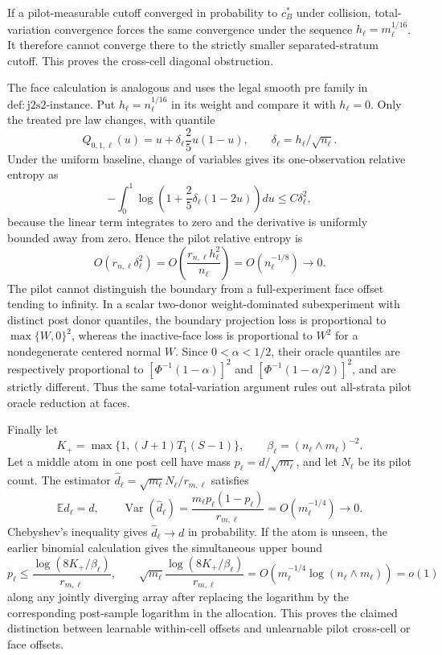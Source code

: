 If a pilot-measurable cutoff converged in probability to \(c_B^*\) under collision, total-variation convergence forces the same convergence under the sequence \(h_\ell=m_\ell^{1/16}\).  It therefore cannot converge there to the strictly smaller separated-stratum cutoff.  This proves the cross-cell diagonal obstruction.

The face calculation is analogous and uses the legal smooth pre family in \(\mathrm{def:j2s2\mbox{-}instance}\).  Put
\(h_\ell=n_\ell^{1/16}\) in its weight and compare it with \(h_\ell=0\).  Only the treated pre law changes, with quantile
\[
 Q_{0,1,\ell}(u)=u+\delta_\ell\frac25u(1-u),
 \qquad \delta_\ell=h_\ell/\sqrt{n_\ell}.
\]
Under the uniform baseline, change of variables gives its one-observation relative entropy as
\[
 -\int_0^1\log\left(1+\frac25\delta_\ell(1-2u)\right)du
 \leq C\delta_\ell^2,
\]
because the linear term integrates to zero and the derivative is uniformly bounded away from zero.  Hence the pilot relative entropy is
\[
 O(r_{n,\ell}\delta_\ell^2)
 =O\left(\frac{r_{n,\ell}h_\ell^2}{n_\ell}\right)
 =O(n_\ell^{-1/8})\longrightarrow0.
\]
The pilot cannot distinguish the boundary from a full-experiment face offset tending to infinity.  In a scalar two-donor weight-dominated subexperiment with distinct post donor quantiles, the boundary projection loss is proportional to
\(\max\{W,0\}^2\), whereas the inactive-face loss is proportional to \(W^2\) for a nondegenerate centered normal \(W\).  Since \(0<\alpha<1/2\), their oracle quantiles are respectively proportional to
\([\Phi^{-1}(1-\alpha)]^2\) and
\([\Phi^{-1}(1-\alpha/2)]^2\), and are strictly different.  Thus the same total-variation argument rules out all-strata pilot oracle reduction at faces.

Finally let
\[
 K_+=\max\{1,(J+1)T_1(S-1)\},
 \qquad \beta_\ell=(n_\ell\wedge m_\ell)^{-2}.
\]
Let a middle atom in one post cell have mass
\(p_\ell=d/\sqrt{m_\ell}\), and let \(N_\ell\) be its pilot count.  The estimator
\(\widehat d_\ell=\sqrt{m_\ell}N_\ell/r_{m,\ell}\) satisfies
\[
 \mathbb E\widehat d_\ell=d,
 \qquad
 \operatorname{Var}(\widehat d_\ell)
 =\frac{m_\ell p_\ell(1-p_\ell)}{r_{m,\ell}}
 =O(m_\ell^{-1/4})\longrightarrow0.
\]
Chebyshev's inequality gives \(\widehat d_\ell\to d\) in probability.  If the atom is unseen, the earlier binomial calculation gives the simultaneous upper bound
\[
 p_\ell\leq
 \frac{\log(8K_+/\beta_\ell)}{r_{m,\ell}},
 \qquad
 \sqrt{m_\ell}\frac{\log(8K_+/\beta_\ell)}{r_{m,\ell}}
 =O(m_\ell^{-1/4}\log(n_\ell\wedge m_\ell))=o(1)
\]
along any jointly diverging array after replacing the logarithm by the corresponding post-sample logarithm in the allocation.  This proves the claimed distinction between learnable within-cell offsets and unlearnable pilot cross-cell or face offsets.

